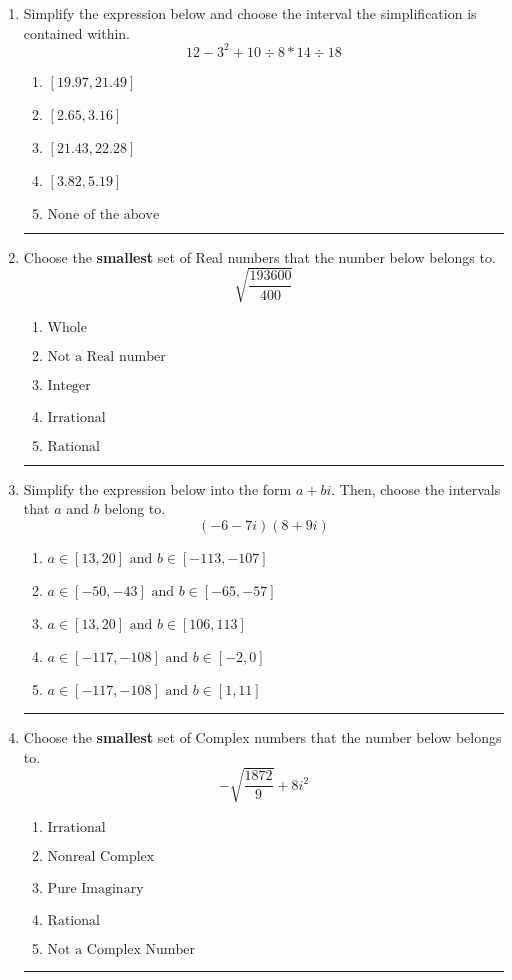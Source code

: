 \documentclass[14pt]{extbook}
\newcommand{\litem}[1]{\item#1\hspace*{-1cm}\rule{\textwidth}{0.4pt}}
\begin{document}
\begin{enumerate}
\litem{
Simplify the expression below and choose the interval the simplification is contained within.\[ 12 - 3^2 + 10 \div 8 * 14 \div 18 \]\begin{enumerate}[label=\Alph*.]
\item \( [19.97, 21.49] \)
\item \( [2.65, 3.16] \)
\item \( [21.43, 22.28] \)
\item \( [3.82, 5.19] \)
\item \( \text{None of the above} \)

\end{enumerate} }
\litem{
Choose the \textbf{smallest} set of Real numbers that the number below belongs to.\[ \sqrt{\frac{193600}{400}} \]\begin{enumerate}[label=\Alph*.]
\item \( \text{Whole} \)
\item \( \text{Not a Real number} \)
\item \( \text{Integer} \)
\item \( \text{Irrational} \)
\item \( \text{Rational} \)

\end{enumerate} }
\litem{
Simplify the expression below into the form $a+bi$. Then, choose the intervals that $a$ and $b$ belong to.\[ (-6 - 7 i)(8 + 9 i) \]\begin{enumerate}[label=\Alph*.]
\item \( a \in [13, 20] \text{ and } b \in [-113, -107] \)
\item \( a \in [-50, -43] \text{ and } b \in [-65, -57] \)
\item \( a \in [13, 20] \text{ and } b \in [106, 113] \)
\item \( a \in [-117, -108] \text{ and } b \in [-2, 0] \)
\item \( a \in [-117, -108] \text{ and } b \in [1, 11] \)

\end{enumerate} }
\litem{
Choose the \textbf{smallest} set of Complex numbers that the number below belongs to.\[ -\sqrt{\frac{1872}{9}}+8i^2 \]\begin{enumerate}[label=\Alph*.]
\item \( \text{Irrational} \)
\item \( \text{Nonreal Complex} \)
\item \( \text{Pure Imaginary} \)
\item \( \text{Rational} \)
\item \( \text{Not a Complex Number} \)


\end{enumerate}}
\end{enumerate}
\end{document}
